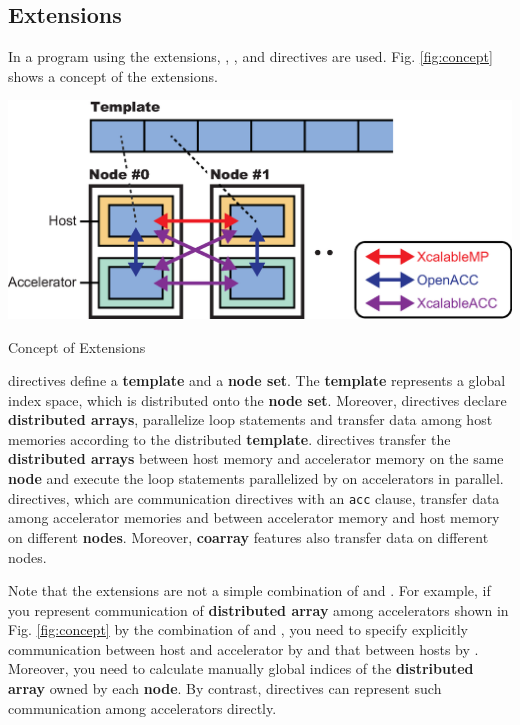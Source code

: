 \subsection{{\XMP} Extensions}
In a program using the {\XMP} extensions,
{\XMP}, {\OACC}, and {\XACC} directives are used.
Fig. \ref{fig:concept} shows a concept of the {\XMP} extensions.

\begin{myfigure}
\includegraphics[scale=0.5,clip]{figs/concept.eps}
  \caption{Concept of {\XMP} Extensions}\label{fig:concept}
\end{myfigure}

{\XMP} directives define a {\bf template} and a {\bf node set}.
The {\bf template} represents a global index space, which is distributed onto the {\bf node set}.
Moreover, {\XMP} directives declare {\bf distributed arrays},
parallelize loop statements and transfer data among host memories according to the distributed {\bf template}.
{\OACC} directives transfer the {\bf distributed arrays} between host memory and accelerator memory on the same {\bf node}
and execute the loop statements parallelized by {\XMP} on accelerators in parallel.
{\XACC} directives, which are {\XMP} communication directives with an {\tt acc} clause, 
transfer data among accelerator memories and between accelerator memory and host memory on different {\bf nodes}.
Moreover, 
{\bf coarray} features also transfer data on different nodes.

Note that 
the {\XMP} extensions are not a simple combination of {\XMP} and {\OACC}.
For example, 
if you represent communication of {\bf distributed array} among accelerators shown in Fig. \ref{fig:concept} by the combination of {\XMP} and {\OACC},
you need to specify explicitly communication between host and accelerator by {\OACC} and that between hosts by {\XMP}.
Moreover,
you need to calculate manually global indices of the {\bf distributed array} owned by each {\bf node}.
By contrast,
{\XACC} directives can represent such communication among accelerators directly.

